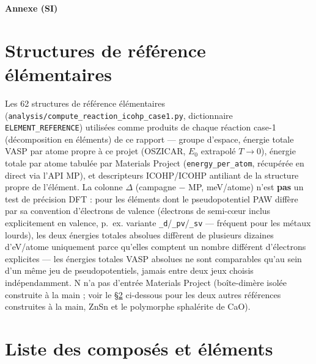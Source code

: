 \documentclass[11pt,a4paper]{article}
\begin{document}
\begin{center}
\Large\textbf{Annexe (SI)}
\end{center}
\vspace{0.3cm}

\section{Structures de référence élémentaires}
\label{sec:appendix-elements}

Les 62 structures de référence élémentaires
(\texttt{analysis/compute\_reaction\_icohp\_case1.py}, dictionnaire
\texttt{ELEMENT\_REFERENCE}) utilisées comme produits de chaque réaction
case-1 (décomposition en éléments) de ce rapport --- groupe d'espace,
énergie totale VASP par atome propre à ce projet (OSZICAR, $E_0$
extrapolé $T\to0$), énergie totale par atome tabulée par Materials
Project (\texttt{energy\_per\_atom}, récupérée en direct via l'API MP),
et descripteurs ICOHP/ICOHP antiliant de la structure propre de
l'élément. La colonne $\Delta$ (campagne $-$ MP, meV/atome) n'est
\textbf{pas} un test de précision DFT : pour les éléments dont le
pseudopotentiel PAW diffère par sa convention d'électrons de valence
(électrons de semi-c\oe{}ur inclus explicitement en valence, p.~ex.
variante \texttt{\_d}/\texttt{\_pv}/\texttt{\_sv} --- fréquent pour les
métaux lourds), les deux énergies totales absolues diffèrent de
plusieurs dizaines d'eV/atome uniquement parce qu'elles comptent un
nombre différent d'électrons explicites --- les énergies totales VASP
absolues ne sont comparables qu'au sein d'un même jeu de
pseudopotentiels, jamais entre deux jeux choisis indépendamment. N n'a pas d'entrée
Materials Project (boîte-dimère isolée construite à la main ; voir le
\S\ref{sec:appendix-master-list} ci-dessous pour les deux autres
références construites à la main, ZnSn et le polymorphe sphalérite de
CaO).

{\scriptsize

}

\section{Liste des composés et éléments}
\label{sec:appendix-master-list}
\end{document}
